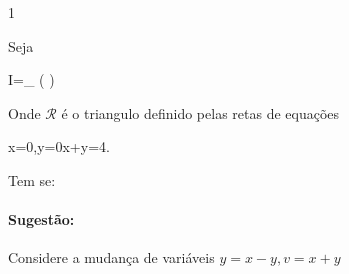 \documentclass[\mainfilename]{subfiles}
\begin{document}
\begin{questionBox}1{ %
    Seja
    \begin{BM}
        I=\iint_{}{
            \exp\left(
            \right)
        }
    \end{BM}
    Onde \(\mathcal{R}\) é o triangulo definido pelas retas de equações
    \begin{BM}
        x=0,y=0x+y=4.
    \end{BM}
    Tem se:
} %
    \paragraph*{Sugestão:} Considere a mudança de variáveis \(y=x-y,v=x+y\)
\end{questionBox}

\setcounter{question}{17}
\end{document}
